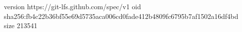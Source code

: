 version https://git-lfs.github.com/spec/v1
oid sha256:fb4c22b36bf55e69d5735aca006cd0fade412b4809fc6795b7af1502a16df4bd
size 213541
